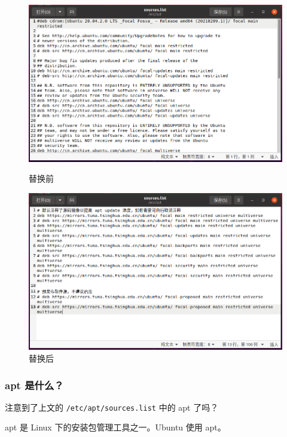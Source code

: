 \documentclass[UTF-8]{ctexart}
\begin{document}
				\begin{figure}[H]
					\centering
					\begin{minipage}{0.38\textwidth}
						\centering
						\includegraphics[width=\textwidth]{fig/sourceslist_before.png}
						\caption*{替换前}
					\end{minipage}
					\begin{minipage}{0.38\textwidth}
						\centering
						\includegraphics[width=\textwidth]{fig/sourceslist_after.png}
						\caption*{替换后}
					\end{minipage}
				\end{figure}
			
			\subsubsection{apt 是什么？}
			
				注意到了上文的 \texttt{/etc/apt/sources.list} 中的 apt 了吗？
	
				apt 是 Linux 下的安装包管理工具之一。Ubuntu 使用 apt。
				
\end{document}
